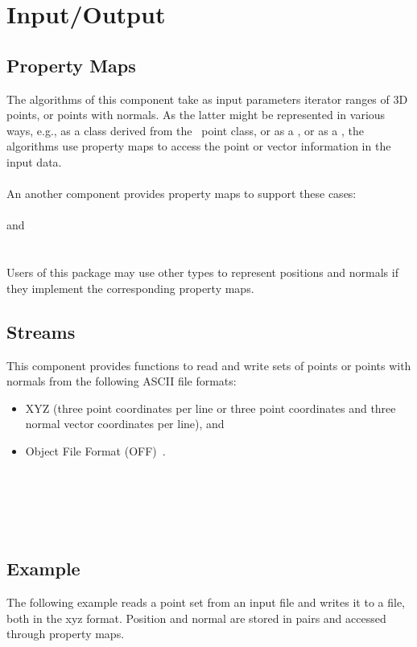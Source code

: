 \section{Input/Output}


\subsection{Property Maps}

The algorithms of this component take as input parameters iterator ranges of 3D points, or points with normals.
As the latter might be represented in various ways, e.g., as a class derived from the \cgal\ point class, or as a
, or as a , the
algorithms use property maps to access the point or vector information in the input data.  \\
\\
An another component provides property maps to support these cases:  \\
  \\
 and   \\
  \\
\\
Users of this package may use other types to represent positions and normals if they implement the corresponding property maps.


\subsection{Streams}

This component provides functions to read and write sets of points or points with normals from the following ASCII file formats:
\begin{itemize}
\item XYZ (three point coordinates  per line or three point coordinates and three normal vector coordinates  per line), and \\
\item Object File Format (OFF)~\cite{cgal:p-gmgv16-96}.
\end{itemize}

  \\
  \\
  \\
  \\


\subsection{Example}

The following example reads a point set from an input file and writes it to a file, both in the xyz format. Position and normal are stored in pairs and accessed through property maps.
